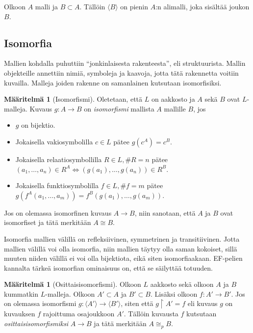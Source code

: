 \documentclass[finnish]{tktltiki2}
\theoremstyle{definition}
\newtheorem{maar}[lau]{Määritelmä}
\theoremstyle{remark}
\begin{document}
Olkoon $A$ malli ja $B \subset A$. Tällöin $\langle B \rangle$ on pienin $A$:n alimalli, joka sisältää joukon $B$. 

\subsection{Isomorfia}
Mallien kohdalla puhuttiin ``jonkinlaisesta rakenteesta'', eli struktuurista. Mallin objekteille annettiin nimiä, symboleja ja kaavoja, jotta tätä rakennetta voitiin kuvailla. Malleja joiden rakenne on samanlainen kutsutaan isomorfisiksi.

\begin{maar}[Isomorfismi]
Oletetaan, että $L$ on aakkosto ja $A$ sekä $B$ ovat $L$-malleja. Kuvaus $g: A \rightarrow B$ on \textit{isomorfismi} mallista $A$ mallille $B$, jos
\begin{itemize}
\item $g$ on bijektio.
\item Jokaisella vakiosymbolilla $c \in L$ pätee $g(c^A) = c^B$.
\item Jokaisella relaatiosymbollilla $R \in L, \#R = n$ pätee $(a_1, \ldots, a_n) \in R^A \Longleftrightarrow (g(a_1), \ldots, g(a_n)) \in R^B$.
\item Jokaisella funktiosymbolilla $f \in L, \#f = m$ pätee $g(f^A(a_1, \ldots, a_m)) = f^B(g(a_1), \ldots, g(a_m))$.
\end{itemize}
Jos on olemassa isomorfinen kuvaus $A \rightarrow B$, niin sanotaan, että $A$ ja $B$ ovat isomorfiset ja tätä merkitään $A \cong B$.
\end{maar}

Isomorfia mallien välillä on refleksiivinen, symmetrinen ja transitiivinen. Jotta mallien välillä voi olla isomorfia, niin mallien täytyy olla saman kokoiset, sillä muuten niiden välillä ei voi olla bijektiota, eikä siten isomorfiaakaan. EF-pelien kannalta tärkeä isomorfian ominaisuus on, että se säilyttää totuuden.

\begin{maar}[Osittaisisomorfismi]
Olkoon $L$ aakkosto sekä olkoon $A$ ja $B$ kummatkin $L$-malleja. Olkoon $A' \subset A$ ja $B' \subset B$. Lisäksi olkoon $f: A' \rightarrow B'$. Jos on olemassa isomorfismi $g: \langle A' \rangle \rightarrow \langle B' \rangle$, siten että $g \restriction A' = f$ eli kuvaus $g$ on kuvauksen $f$ rajoittuma osajoukkoon $A'$. Tällöin kuvausta $f$ kutsutaan \textit{osittaisisomorfismiksi} $A \rightarrow B$ ja tätä merkitään $A \cong_p B$.
\end{maar}
\end{document}
